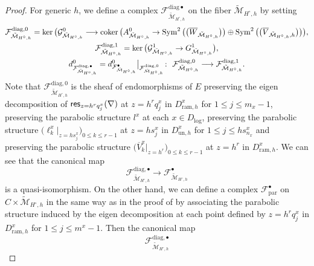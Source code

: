 \documentclass[pdftex]{sigma}
\numberwithin{equation}{section}
\newcommand\coker{\mathop{\rm coker}\nolimits}
\newcommand{\res}{\mathop{\sf res}\nolimits}
\newcommand{\Sym}{\mathop{\rm Sym}\nolimits}
\begin{document}
\begin{proof}
For generic $h$,
we define a complex ${\mathcal F}_{\tilde{\mathcal M}_{H^{\circ},h}}^{\mathrm{diag} \bullet}$
on the fiber $\tilde{\mathcal M}_{H^{\circ},h}$
by setting
\begin{gather*}
 {\mathcal F}^{\mathrm{diag},0}_{\tilde{\mathcal M}_{H^{\circ},h}}
 =
 \ker \big( {\mathcal G}^0_{\tilde{\mathcal M}_{H^{\circ},h}}
 \longrightarrow
 \coker \big( A^0_{\tilde{\mathcal M}_{H^{\circ},h}} \rightarrow
 \Sym^2\big(\big( \overline{W}_{\tilde{\mathcal M}_{H^{\circ},h}} \big)\big)
 \oplus \Sym^2\big( \big(\overline{V}_{\tilde{\mathcal M}_{H^{\circ},h},h}\big)\big)
\big),
 \\
 {\mathcal F}^{\mathrm{diag},1}_{\tilde{\mathcal M}_{H^{\circ},h}}
 =
 \ker \big( {\mathcal G}^1_{\tilde{\mathcal M}_{H^{\circ},h}}
 \rightarrow G^1_{\tilde{\mathcal M}_{H^{\circ},h}} \big),
 \\
 d^0_{{\mathcal F}^{\mathrm{diag},\bullet}_{\tilde{\mathcal M}_{H^{\circ},h}}}
 =
 d^0_{{\mathcal F}^{\bullet}_{\tilde{\mathcal M}_{H^{\circ},h}}}
 \big|_{{\mathcal F}^{\mathrm{diag},0}_{\tilde{\mathcal M}_{H^{\circ},h}}}
 \colon \
 {\mathcal F}^{\mathrm{diag},0}_{\tilde{\mathcal M}_{H^{\circ},h}} \longrightarrow
 {\mathcal F}^{\mathrm{diag},1}_{\tilde{\mathcal M}_{H^{\circ},h}}.
\end{gather*}
Note that ${\mathcal F}^{\mathrm{diag},0}_{\tilde{\mathcal M}_{H^{\circ},h}}$
is the sheaf of endomorphisms of $E$ preserving the eigen decomposition
of $\res_{z=h^r q^x_j}(\nabla)$
at $z=h^r q^x_j$ in $D^x_{\mathrm{ram},h}$ for $1\leq j\leq m_x-1$,
preserving the parabolic structure $l^x$ at each
$x\in D_{\mathrm{log}}$,
preserving the parabolic structure
$\big(\ell_k^x|_{z=hs^x_j}\big)_{0\leq k\leq r-1}$
at $z=hs^x_j$ in $D^x_{\mathrm{un},h}$ for $1\leq j\leq hs^x_{n_x}$
and preserving the parabolic structure
$\big(\overline{V}^x_k|_{z=h^r}\big)_{0\leq k\leq r-1}$
at $z=h^r$ in $D^x_{\mathrm{ram},h}$.
We can see that the canonical map
\[
 {\mathcal F}^{\mathrm{diag},\bullet}_{\tilde{\mathcal M}_{H^{\circ},h}}
 \longrightarrow {\mathcal F}^{\bullet}_{\tilde{\mathcal M}_{H^{\circ},h}}
\]
is a quasi-isomorphism.
On the other hand, we can define a complex
${\mathcal F}_{\mathrm{par}}^{\bullet}$ on $C\times \tilde{\mathcal M}_{H^{\circ},h}$
in the same way as
in the proof of \cite[Proposition 7.2]{Inaba-1}
by associating the parabolic structure induced by the eigen decomposition
at each point defined by $z=h^rq^x_j$ in $D^x_{\mathrm{ram},h}$
for $1\leq j\leq m^x-1$.
Then the canonical map
\[
 {\mathcal F}^{\mathrm{diag},\bullet}_{\tilde{\mathcal M}_{H^{\circ},h}}
\]
\end{proof}
\end{document}
